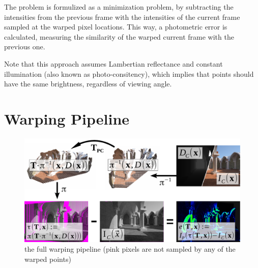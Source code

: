 The problem is formulized as a minimization problem, by subtracting the
intensities from the previous frame with the intensities of the current frame
sampled at the warped pixel locations. This way, a photometric error is
calculated, measuring the similarity of the warped current frame with the
previous one.

Note that this approach assumes Lambertian reflectance and constant
illumination (also known as photo-consitency), which implies that points should
have the same brightness, regardless of viewing angle.


\section{Warping Pipeline}
\label{sec:warping}

\begin{figure}[h]
    \centering
    \includegraphics[width=\textwidth]{images/warp_pipeline.pdf}
    \caption{the full warping pipeline (pink pixels are not sampled by any of the warped points)}
    \label{fig:warp_pipeline}
\end{figure}

